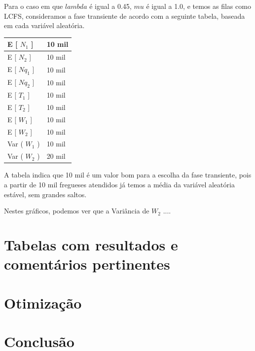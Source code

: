 \documentclass[a4paper,10pt]{article}
\begin{document}

    Para o caso em que $lambda$ é igual a 0.45, $mu$ é igual a 1.0, e temos as filas como LCFS, consideramos a fase transiente de acordo com a seguinte tabela, baseada em cada variável aleatória.

\begin{center}
\begin{tabular} { | l | l | }
    \hline
    E [ $N_1$ ]  & 10 mil \\ \hline
    E [ $N_2$ ] & 10 mil \\ \hline
    E [ $Nq_1$ ] & 10 mil \\ \hline
    E [ $Nq_2$ ]	& 10 mil \\ \hline
    E [ $T_1$ ] & 10 mil \\ \hline
    E [ $T_2$ ] & 10 mil \\ \hline
    E [ $W_1$ ] & 10 mil \\ \hline
    E [ $W_2$ ] & 10 mil \\ \hline
    Var ( $W_1$ ) & 10 mil \\ \hline
    Var ( $W_2$ ) & 20 mil \\ \hline
    \hline
\end{tabular}
\end{center}

    A tabela indica que 10 mil é um valor bom para a escolha da fase transiente, pois a partir de 10 mil fregueses atendidos já temos a média da variável aleatória estável, sem grandes saltos.

    Nestes gráficos, podemos ver que a Variância de $W_2$ ....



\pagebreak

\section{Tabelas com resultados e comentários pertinentes}
\pagebreak

\section{Otimização}
\pagebreak

\section{Conclusão}

\pagebreak
\end{document}
